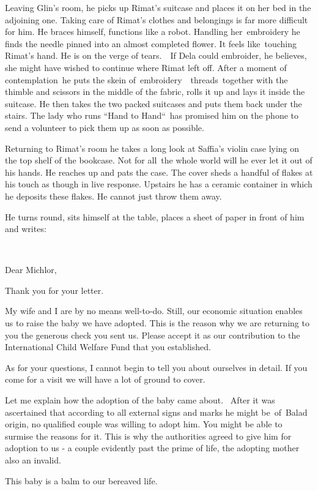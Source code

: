 \documentclass[twoside,11pt]{book}
\begin{document}
Leaving Glin's room, he picks up Rimat's suitcase and places it on her bed in the adjoining one. Taking care of Rimat's
clothes and belongings is far more difficult for him. He braces himself, functions like a robot. Handling
her\ embroidery he finds the needle pinned into an almost completed flower. It feels like~touching Rimat's hand. He is
on the verge of tears{.}\ \ If Dela could embroider, he believes, she might
have wished to continue where Rimat left off. After a moment of contemplation\ he puts the skein
of\ embroidery\ \ threads\ together with the thimble and scissors in the middle of the fabric, rolls it up and lays it
inside the suitcase. He then takes the two packed suitcases and puts them back under the stairs. The lady who runs
``Hand to Hand``~has promised him on the phone to send a volunteer to pick them up as soon as
possible. 

Returning to Rimat's room he takes a long look at Saffia's violin case lying on the top shelf of the bookcase. Not for
all{\ }the whole world will he ever let it out of his hands. He reaches up and
pats the case. The cover sheds a handful of flakes at his touch as though in live response. Upstairs he has a ceramic
container in which he deposits these flakes. He cannot just throw them away.

He turns round, sits himself at the table, places a sheet of paper in front of him and writes:

~

Dear Michlor,

Thank you for your letter. 

My wife and I are by no means well-to-do. Still, our economic situation enables us to raise the baby we have adopted.
This is the reason why we are returning to you the generous check you sent us. Please accept it as our contribution to
the International Child Welfare Fund that you established.

As for your questions, I cannot begin to tell you about ourselves in detail. If you come for a visit we will have a lot
of ground to cover.

Let me explain how the adoption of the baby came about. \ After it was ascertained that according to all external signs
and marks he might be~of~Balad origin, no qualified couple was willing to adopt him. You might be able to surmise the
reasons for it. This is why the authorities agreed to give him for adoption to us - a couple evidently past the prime
of life, the adopting mother also an invalid.\ 

This baby is a balm to our bereaved life.
\end{document}

